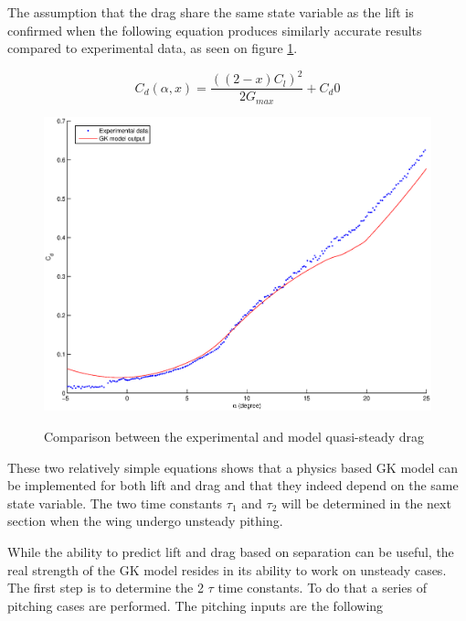 \par The assumption that the drag share the same state variable as the lift is confirmed when the following equation produces similarly accurate results compared to experimental data, as seen on figure \ref{fig:GK_Cd_vs_alpha}.

\begin{equation}
  C_d(\alpha,x)= \frac{ \left( \left( 2 - x \right)C_l \right)^2 }{2 G_{max}} + C_d0
  \label{eqn:Cd_function}
\end{equation}

\begin{figure}[h]
  \begin{center}
    \scalebox{0.6}
    {\includegraphics{./Figures/GK_cd_vs_alpha.eps}}
  \end{center}
  \caption{Comparison between the experimental and model quasi-steady drag}
  \label{fig:GK_Cd_vs_alpha}
\end{figure}

\par These two relatively simple equations shows that a physics based GK model can be implemented for both lift and drag and that they indeed depend on the same state variable.
The two time constants $\tau_1$ and $\tau_2$ will be determined in the next section when the wing undergo unsteady pithing.


\par While the ability to predict lift and drag based on separation can be useful, the real strength of the GK model resides in its ability to work on unsteady cases.
The first step is to determine the 2 $\tau$ time constants. 
To do that a series of pitching cases are performed. 
The pitching inputs are the following

